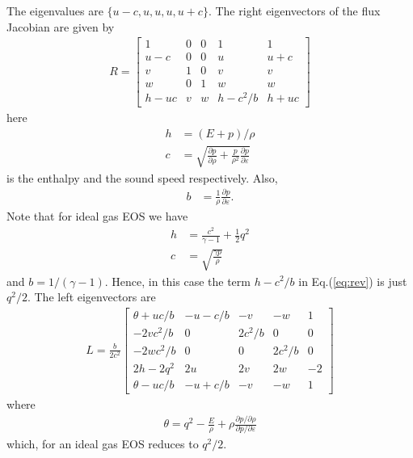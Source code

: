 \documentclass[11pt, reqno]{amsart}
\newcommand{\eqr}[1]{Eq.\thinspace(#1)}
\newcommand{\pfrac}[2]{\frac{\partial #1}{\partial #2}}
\newcommand{\pfracb}[2]{\partial #1/\partial #2}
\theoremstyle{definition}
\begin{document}
The eigenvalues are $\{u-c, u, u, u, u+c\}$. The right
eigenvectors of the flux Jacobian are given by
\begin{align}
  R
  =
  \left[
    \begin{matrix}
      1 & 0 & 0 & 1 & 1 \\
      u-c & 0 & 0 & u & u+c \\
      v & 1 & 0 & v & v \\
      w & 0 & 1 & w & w \\
      h-uc & v & w & h-c^2/b & h+uc
    \end{matrix}
  \right]
  \label{eq:rev}
\end{align}
here
\begin{align}
  h &= (E+p)/\rho \\
  c &= \sqrt{\pfrac{p}{\rho} + \frac{p}{\rho^2}\pfrac{p}{\varepsilon}}
\end{align}
is the enthalpy and the sound speed respectively. Also,
\begin{align}
  b &= \frac{1}{\rho}\pfrac{p}{\varepsilon}.
\end{align}
Note that for ideal gas EOS we have
\begin{align}
  h &= \frac{c^2}{\gamma-1} + \frac{1}{2}q^2 \\
  c &= \sqrt{\frac{\gamma p}{\rho}}
\end{align}
and $b=1/(\gamma-1)$. Hence, in this case the term $h-c^2/b$ in
\eqr{\ref{eq:rev}} is just $q^2/2$. The left eigenvectors are
\begin{align}
  L
  =
  \frac{b}{2c^2}
  \left[
    \begin{matrix}
      \theta+uc/b & -u-c/b & -v & -w & 1 \\
      -2vc^2/b & 0 & 2c^2/b & 0 & 0 \\
      -2wc^2/b & 0 & 0 & 2c^2/b & 0 \\
      2h-2q^2 & 2u & 2v & 2w & -2 \\
      \theta-uc/b & -u+c/b & -v & -w & 1
    \end{matrix}
  \right]
  \label{eq:rev}
\end{align}
where
\begin{align}
  \theta = q^2 - \frac{E}{\rho} + \rho\frac{\pfracb{p}{\rho}}{\pfracb{p}{\varepsilon}}
\end{align}
which, for an ideal gas EOS reduces to $q^2/2$.



\end{document}
